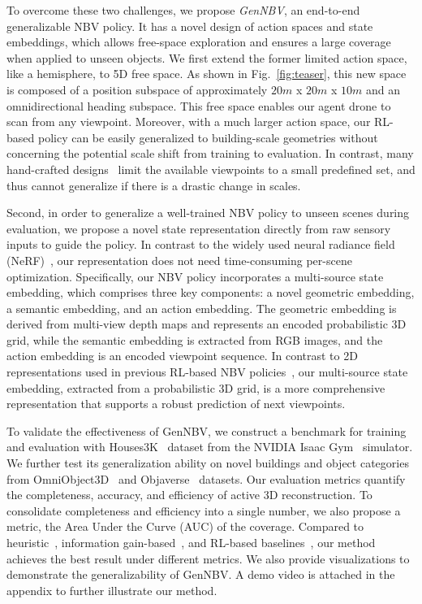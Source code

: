 To overcome these two challenges, we propose \textit{GenNBV}, an end-to-end generalizable NBV policy. It has a novel design of action spaces and state embeddings, which allows free-space exploration and ensures a large coverage when applied to unseen objects.
We first extend the former limited action space, like a hemisphere, to 5D free space. As shown in Fig.~\ref{fig:teaser}, this new space is composed of a position subspace of approximately $20m$ x $20m$ x $10m$ and an omnidirectional heading subspace. This free space enables our agent drone to scan from any viewpoint.
Moreover, with a much larger action space, our RL-based policy can be easily generalized to building-scale geometries without concerning the potential scale shift from training to evaluation. In contrast, many hand-crafted designs~\citep{pan2022activenerf, lee2022uncertainty} limit the available viewpoints to a small predefined set, and thus cannot generalize if there is a drastic change in scales.


Second, in order to generalize a well-trained NBV policy to unseen scenes during evaluation, we propose a novel state representation directly from raw sensory inputs to guide the policy. In contrast to the widely used neural radiance field (NeRF)~\citep{pan2022activenerf, zhan2022activermap, lee2022uncertainty, smith2022uncertainty,ran2023neurar}, our representation does not need time-consuming per-scene optimization. 
Specifically, our NBV policy incorporates a multi-source state embedding, which comprises three key components: a novel geometric embedding, a semantic embedding, and an action embedding. The geometric embedding is derived from multi-view depth maps and represents an encoded probabilistic 3D grid, while the semantic embedding is extracted from RGB images, and the action embedding is an encoded viewpoint sequence.
In contrast to 2D representations used in previous RL-based NBV policies~\citep{chenlearning, chaplotlearning}, our multi-source state embedding, extracted from a probabilistic 3D grid, is a more comprehensive representation that supports a robust prediction of next viewpoints.


To validate the effectiveness of GenNBV, we construct a benchmark for training and evaluation with Houses3K~\citep{houses3k} dataset from the NVIDIA Isaac Gym~\citep{makoviychuk2021isaac} simulator. We further test its generalization ability on novel buildings and object categories from OmniObject3D~\citep{wu2023omniobject3d} and Objaverse~\citep{deitke2023objaverse} datasets.
Our evaluation metrics quantify the completeness, accuracy, and efficiency of active 3D reconstruction.
To consolidate completeness and efficiency into a single number, we also propose a metric, the Area Under the Curve (AUC) of the coverage. 
Compared to heuristic~\citep{isler2016information}, information gain-based~\citep{isler2016information, lee2022uncertainty, zhan2022activermap}, and RL-based baselines~\citep{peralta2020next}, our method achieves the best result under different metrics.
We also provide visualizations to demonstrate the generalizability of GenNBV.
A demo video is attached in the appendix to further illustrate our method.

